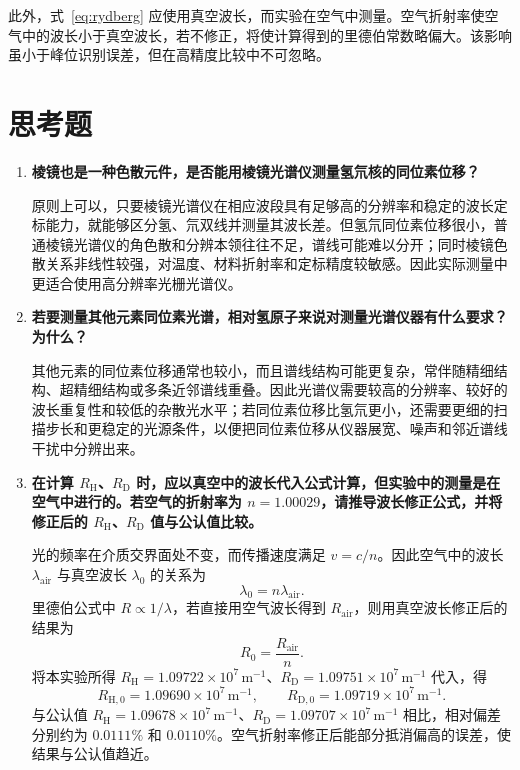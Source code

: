 \documentclass[12pt,a4paper]{article}
\begin{document}
此外，式~\eqref{eq:rydberg} 应使用真空波长，而实验在空气中测量。空气折射率使空气中的波长小于真空波长，若不修正，将使计算得到的里德伯常数略偏大。该影响虽小于峰位识别误差，但在高精度比较中不可忽略。

\section{思考题}
\begin{enumerate}
    \item \textbf{棱镜也是一种色散元件，是否能用棱镜光谱仪测量氢氘核的同位素位移？}

    原则上可以，只要棱镜光谱仪在相应波段具有足够高的分辨率和稳定的波长定标能力，就能够区分氢、氘双线并测量其波长差。但氢氘同位素位移很小，普通棱镜光谱仪的角色散和分辨本领往往不足，谱线可能难以分开；同时棱镜色散关系非线性较强，对温度、材料折射率和定标精度较敏感。因此实际测量中更适合使用高分辨率光栅光谱仪。

    \item \textbf{若要测量其他元素同位素光谱，相对氢原子来说对测量光谱仪器有什么要求？为什么？}

    其他元素的同位素位移通常也较小，而且谱线结构可能更复杂，常伴随精细结构、超精细结构或多条近邻谱线重叠。因此光谱仪需要较高的分辨率、较好的波长重复性和较低的杂散光水平；若同位素位移比氢氘更小，还需要更细的扫描步长和更稳定的光源条件，以便把同位素位移从仪器展宽、噪声和邻近谱线干扰中分辨出来。

    \item \textbf{在计算 $R_{\mathrm H}$、$R_{\mathrm D}$ 时，应以真空中的波长代入公式计算，但实验中的测量是在空气中进行的。若空气的折射率为 $n=1.00029$，请推导波长修正公式，并将修正后的 $R_{\mathrm H}$、$R_{\mathrm D}$ 值与公认值比较。}

    光的频率在介质交界面处不变，而传播速度满足 $v=c/n$。因此空气中的波长 $\lambda_{\mathrm{air}}$ 与真空波长 $\lambda_0$ 的关系为
    \begin{equation}
        \lambda_0=n\lambda_{\mathrm{air}}.
    \end{equation}
    里德伯公式中 $R\propto1/\lambda$，若直接用空气波长得到 $R_{\mathrm{air}}$，则用真空波长修正后的结果为
    \begin{equation}
        R_0=\frac{R_{\mathrm{air}}}{n}.
    \end{equation}
    将本实验所得 $R_{\mathrm H}=1.09722\times10^7\,\mathrm{m}^{-1}$、$R_{\mathrm D}=1.09751\times10^7\,\mathrm{m}^{-1}$ 代入，得
    \begin{equation}
        R_{\mathrm H,0}=1.09690\times10^7\,\mathrm{m}^{-1},\qquad
        R_{\mathrm D,0}=1.09719\times10^7\,\mathrm{m}^{-1}.
    \end{equation}
    与公认值 $R_{\mathrm H}=1.09678\times10^7\,\mathrm{m}^{-1}$、$R_{\mathrm D}=1.09707\times10^7\,\mathrm{m}^{-1}$ 相比，相对偏差分别约为 $0.0111\%$ 和 $0.0110\%$。空气折射率修正后能部分抵消偏高的误差，使结果与公认值趋近。
\end{enumerate}
\end{document}
